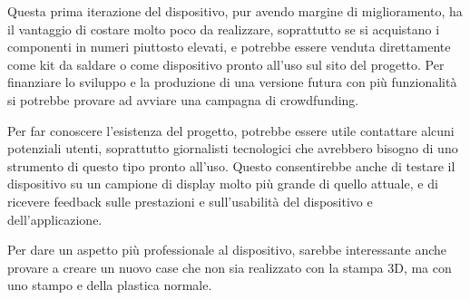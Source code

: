 Questa prima iterazione del dispositivo, pur avendo margine di miglioramento, ha il vantaggio di costare molto poco da realizzare, soprattutto se si acquistano i componenti in numeri piuttosto elevati, e potrebbe essere venduta direttamente come kit da saldare o come dispositivo pronto all'uso sul sito del progetto. Per finanziare lo sviluppo e la produzione di una versione futura con più funzionalità si potrebbe provare ad avviare una campagna di crowdfunding.

Per far conoscere l'esistenza del progetto, potrebbe essere utile contattare alcuni potenziali utenti, soprattutto giornalisti tecnologici che avrebbero bisogno di uno strumento di questo tipo pronto all'uso. Questo consentirebbe anche di testare il dispositivo su un campione di display molto più grande di quello attuale, e di ricevere feedback sulle prestazioni e sull'usabilità del dispositivo e dell'applicazione.

Per dare un aspetto più professionale al dispositivo, sarebbe interessante anche provare a creare un nuovo case che non sia realizzato con la stampa 3D, ma con uno stampo e della plastica normale.

